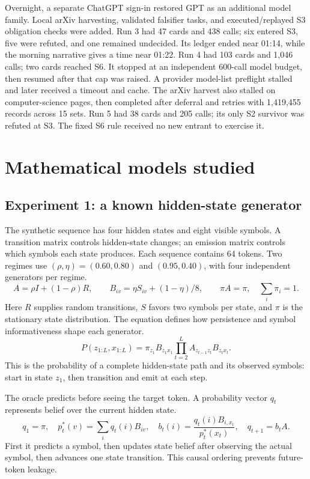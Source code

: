 Overnight, a separate ChatGPT sign-in restored GPT as an additional model family. Local arXiv harvesting, validated falsifier tasks, and executed/replayed S3 obligation checks were added. Run 3 had 47 cards and 438 calls; six entered S3, five were refuted, and one remained undecided. Its ledger ended near 01:14, while the morning narrative gives a time near 01:22. Run 4 had 103 cards and 1,046 calls; two cards reached S6. It stopped at an independent 600-call model budget, then resumed after that cap was raised. A provider model-list preflight stalled and later received a timeout and cache. The arXiv harvest also stalled on computer-science pages, then completed after deferral and retries with 1,419,455 records across 15 sets. Run 5 had 38 cards and 205 calls; its only S2 survivor was refuted at S3. The fixed S6 rule received no new entrant to exercise it.

\section{Mathematical models studied}
\subsection{Experiment 1: a known hidden-state generator}

The synthetic sequence has four hidden states and eight visible symbols. A transition matrix controls hidden-state changes; an emission matrix controls which symbols each state produces. Each sequence contains 64 tokens. Two regimes use $(\rho,\eta)=(0.60,0.80)$ and $(0.95,0.40)$, with four independent generators per regime.
\begin{equation}
A=\rho I+(1-\rho)R,\qquad B_{iv}=\eta S_{iv}+(1-\eta)/8,\qquad \pi A=\pi,\quad \sum_i\pi_i=1.
\end{equation}
Here $R$ supplies random transitions, $S$ favors two symbols per state, and $\pi$ is the stationary state distribution. The equation defines how persistence and symbol informativeness shape each generator.
\begin{equation}
P(z_{1:L},x_{1:L})=\pi_{z_1}B_{z_1x_1}\prod_{t=2}^{L}A_{z_{t-1}z_t}B_{z_tx_t}.
\end{equation}
This is the probability of a complete hidden-state path and its observed symbols: start in state $z_1$, then transition and emit at each step.

The oracle predicts before seeing the target token. A probability vector $q_t$ represents belief over the current hidden state.
\begin{equation}
q_1=\pi,\quad p_t^*(v)=\sum_iq_t(i)B_{iv},\quad b_t(i)=\frac{q_t(i)B_{i,x_t}}{p_t^*(x_t)},\quad q_{t+1}=b_tA.
\end{equation}
First it predicts a symbol, then updates state belief after observing the actual symbol, then advances one state transition. This causal ordering prevents future-token leakage.

